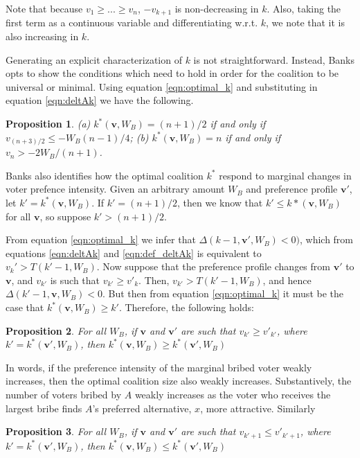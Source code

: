 \documentclass[12pt,a4paper]{article}
\newtheorem{proposition}{Proposition}
\begin{document}
Note that because $v_1 \geq ... \geq v_n$, $-v_{k + 1}$ is non-decreasing in $k$. Also, taking the first term as a continuous variable and differentiating w.r.t. $k$, we note that it is also increasing in $k$.

Generating an explicit characterization of $k$ is not straightforward. Instead, Banks opts to show the conditions which need to hold in order for the coalition to be universal or minimal. Using equation \ref{eqn:optimal_k} and substituting in equation \ref{eqn:deltAk} we have the following.

\begin{proposition}
    (a) $k^*(\mathbf{v}, W_B) = (n + 1)/2$ if and only if $v_{(n + 3)/2} \leq -W_B(n - 1)/4$; (b) $k^*(\mathbf{v}, W_B) = n$ if and only if $v_n > -2W_B/(n + 1)$.
\end{proposition}

Banks also identifies how the optimal coalition $k^*$ respond to marginal changes in voter prefence intensity. Given an arbitrary amount $W_B$ and preference profile $\mathbf{v}'$, let $k' = k^*(\mathbf{v}, W_B)$. If $k' = (n + 1)/2$, then we know that $k' \leq k*(\mathbf{v}, W_B)$ for all $\mathbf{v}$, so suppose $k' > (n + 1)/2$.

From equation \ref{eqn:optimal_k} we infer that $\Delta(k - 1, \mathbf{v}', W_B) < 0)$, which from equations \ref{eqn:deltAk} and \ref{eqn:def_deltAk} is equivalent to $v_k' > T(k' - 1, W_B)$. Now suppose that the preference profile changes from $\mathbf{v}'$ to $\mathbf{v}$, and $v_{k'}$ is such that $v_{k'} \geq v'_k$. Then, $v_{k'} > T(k' - 1, W_B)$, and hence $\Delta(k' - 1, \mathbf{v}, W_B) < 0$. But then from equation \ref{eqn:optimal_k} it must be the case that $k^*(\mathbf{v}, W_B) \geq k'$. Therefore, the following holds:

\begin{proposition}
    For all $W_B$, if $\mathbf{v}$ and $\mathbf{v}'$ are such that $v_{k'} \geq v'_{k'}$, where $k' = k^*(\mathbf{v}', W_B)$, then $k^*(\mathbf{v}, W_B) \geq k^*(\mathbf{v}', W_B)$
\end{proposition}

In words, if the preference intensity of the marginal bribed voter weakly increases, then the optimal coalition size also weakly increases. Substantively, the number of voters bribed by $A$ weakly increases as the voter who receives the largest bribe finds $A$'s preferred alternative, $x$, more attractive. Similarly

\begin{proposition}
    For all $W_B$, if $\mathbf{v}$ and $\mathbf{v}'$ are such that $v_{k' + 1} \leq v'_{k' + 1}$, where $k' = k^*(\mathbf{v}', W_B)$, then $k^*(\mathbf{v}, W_B) \leq k^*(\mathbf{v}', W_B)$
\end{proposition}
\end{document}
